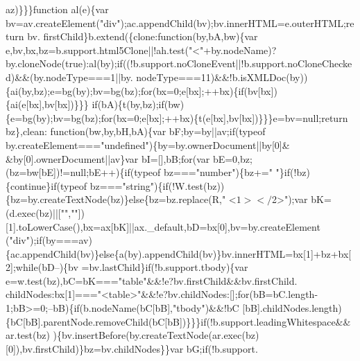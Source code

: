 \begin{DoxyCode}
      az)\}\}\}\textcolor{keyword}{function} al(e)\{var bv=av.createElement(\textcolor{stringliteral}{"div"});ac.appendChild(bv);bv.innerHTML=e.outerHTML;\textcolor{keywordflow}{return} bv.
      firstChild\}b.extend(\{clone:\textcolor{keyword}{function}(by,bA,bw)\{var e,bv,bx,bz=b.support.html5Clone||!ah.test(\textcolor{stringliteral}{"<"}+by.nodeName)?
      by.cloneNode(\textcolor{keyword}{true}):al(by);\textcolor{keywordflow}{if}((!b.support.noCloneEvent||!b.support.noCloneChecked)&&(by.nodeType===1||by.
      nodeType===11)&&!b.isXMLDoc(by))\{ai(by,bz);e=bg(by);bv=bg(bz);\textcolor{keywordflow}{for}(bx=0;e[bx];++bx)\{\textcolor{keywordflow}{if}(bv[bx])\{ai(e[bx],bv[bx])\}\}\}\textcolor{keywordflow}{
      if}(bA)\{t(by,bz);\textcolor{keywordflow}{if}(bw)\{e=bg(by);bv=bg(bz);\textcolor{keywordflow}{for}(bx=0;e[bx];++bx)\{t(e[bx],bv[bx])\}\}\}e=bv=null;\textcolor{keywordflow}{return} bz\},clean:\textcolor{keyword}{
      function}(bw,by,bH,bA)\{var bF;by=by||av;\textcolor{keywordflow}{if}(typeof by.createElement===\textcolor{stringliteral}{"undefined"})\{by=by.ownerDocument||by[0]&
      &by[0].ownerDocument||av\}var bI=[],bB;\textcolor{keywordflow}{for}(var bE=0,bz;(bz=bw[bE])!=null;bE++)\{\textcolor{keywordflow}{if}(typeof bz===\textcolor{stringliteral}{"number"})\{bz+=\textcolor{stringliteral}{"
      "}\}\textcolor{keywordflow}{if}(!bz)\{\textcolor{keywordflow}{continue}\}\textcolor{keywordflow}{if}(typeof bz===\textcolor{stringliteral}{"string"})\{\textcolor{keywordflow}{if}(!W.test(bz))\{bz=by.createTextNode(bz)\}\textcolor{keywordflow}{else}\{bz=bz.replace(R,\textcolor{stringliteral}{"
      <$1></$2>"});var bK=(d.exec(bz)||[\textcolor{stringliteral}{""},\textcolor{stringliteral}{""}])[1].toLowerCase(),bx=ax[bK]||ax.\_default,bD=bx[0],bv=by.createElement
      (\textcolor{stringliteral}{"div"});\textcolor{keywordflow}{if}(by===av)\{ac.appendChild(bv)\}\textcolor{keywordflow}{else}\{a(by).appendChild(bv)\}bv.innerHTML=bx[1]+bz+bx[2];\textcolor{keywordflow}{while}(bD--)\{bv
      =bv.lastChild\}\textcolor{keywordflow}{if}(!b.support.tbody)\{var e=w.test(bz),bC=bK===\textcolor{stringliteral}{"table"}&&!e?bv.firstChild&&bv.firstChild.
      childNodes:bx[1]===\textcolor{stringliteral}{"<table>"}&&!e?bv.childNodes:[];\textcolor{keywordflow}{for}(bB=bC.length-1;bB>=0;--bB)\{\textcolor{keywordflow}{if}(b.nodeName(bC[bB],\textcolor{stringliteral}{"tbody"})&&!bC
      [bB].childNodes.length)\{bC[bB].parentNode.removeChild(bC[bB])\}\}\}\textcolor{keywordflow}{if}(!b.support.leadingWhitespace&&ar.test(bz)
      )\{bv.insertBefore(by.createTextNode(ar.exec(bz)[0]),bv.firstChild)\}bz=bv.childNodes\}\}var bG;\textcolor{keywordflow}{if}(!b.support.

\end{DoxyCode}
